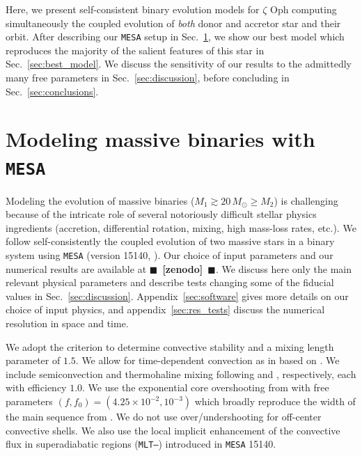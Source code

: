 \documentclass[twocolumn,twocolappendix,trackchanges]{aastex63}
\DeclareRobustCommand{\Secref}[1]{Sec.~\ref{#1}}
\newcommand{\zoph}{$\zeta$ Oph}
\newcommand{\todo}[1]{{\large $\blacksquare$~\textbf{\color{red}[#1]}}~$\blacksquare$}
\begin{document}
Here, we present self-consistent binary evolution models for
$\zeta$ Oph computing simultaneously the coupled evolution of
\emph{both} donor and accretor star and their orbit. After describing
our \texttt{MESA} setup in \Secref{sec:methods}, we show our best model which
reproduces the majority of the salient features of this star in
\Secref{sec:best_model}. %
We discuss the
sensitivity of our results to the admittedly many free parameters
in
\Secref{sec:discussion}, before concluding in
\Secref{sec:conclusions}.



\section{Modeling massive binaries with \texttt{MESA}}
\label{sec:methods}

Modeling the evolution of massive binaries
($M_1\gtrsim 20\,M_\odot \geq M_2$) is challenging because of the
intricate role of several notoriously difficult stellar physics
ingredients (accretion, differential rotation, mixing, high mass-loss
rates, etc.). We follow self-consistently the coupled evolution
of two massive stars in a binary system using \texttt{MESA} (version
15140, \citealt{paxton:11, paxton:13, paxton:15, paxton:18,
  paxton:19}). Our choice of input parameters and our numerical
results are available at \todo{zenodo}. We discuss here
only the main relevant physical parameters and describe tests changing
some of the fiducial values in
\Secref{sec:discussion}. Appendix~\ref{sec:software} gives more
details on our choice of input physics, and
appendix~\ref{sec:res_tests} discuss the numerical resolution in space
and time.

We adopt the \cite{ledoux:47} criterion to determine convective
stability and a mixing length parameter of $1.5$. We allow for
time-dependent convection as in \cite{renzo:20:ppi_conv} based on
\cite{arnett:69}. We include semiconvection and thermohaline mixing
following \cite{langer:83} and \cite{kippenhahn:80}, respectively,
each with efficiency $1.0$. We use the exponential core overshooting
from \cite{herwig:00} with free parameters
$(f, f_0)=(4.25\times10^{-2}, 10^{-3})$ \citep{claret:17} which
broadly reproduce the width of the main sequence from
\cite{brott:11}. We do not use over/undershooting for off-center
convective shells. We also use the local implicit enhancement of the
convective flux in superadiabatic regions (\texttt{MLT--}) introduced
in \texttt{MESA} 15140.
\end{document}
